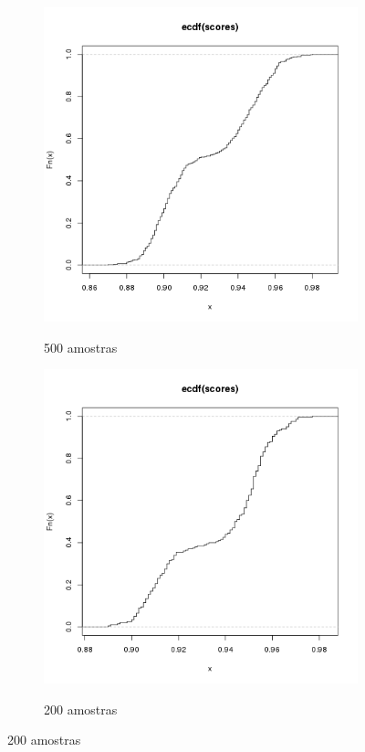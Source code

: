 \documentclass[11pt,a4paper]{article}
\begin{document}
\begin{figure}
    \caption{ECDFs - Nexus 7, Android 4.3 Chrome}
    \label{nexus43ecdfs}
    \begin{subfigure}{.5\textwidth}
        \caption{500 amostras}
        \centering
        \includegraphics[width=\textwidth]{images/ecdf-n7-a43-chrome-500-amostras-20131119}
        \label{nexus43500}
    \end{subfigure}
    \begin{subfigure}{.5\textwidth}
        \caption{200 amostras}
        \centering
        \includegraphics[width=\textwidth]{images/ecdf-n7-a43-chrome-200-amostras-20131120}
        \label{nexus43200}
    \end{subfigure}
\end{figure}
\end{document}

